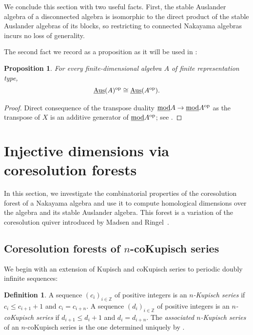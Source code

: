 \documentclass[a4paper]{amsart}
\newtheorem{proposition}[theorem]{Proposition}
\theoremstyle{definition}
\newtheorem{definition}[theorem]{Definition}
\theoremstyle{remark}
\numberwithin{equation}{theorem}
\newcommand{\Dfn}[1]{\emph{\color{blue}#1}} %
\renewcommand{\mod}{\operatorname{mod}}
\newcommand{\sAus}{\operatorname{\underline{Aus}}}
\newcommand{\Z}{\mathbb{Z}}
\newcommand{\op}{\textnormal{op}}
\begin{document}
We conclude this section with two useful facts.
First, the stable Auslander algebra of a disconnected algebra is isomorphic to the direct product of the stable Auslander algebras of its blocks, so restricting to connected Nakayama algebras incurs no loss of generality.

The second fact we record as a proposition as it will be used in :

\begin{proposition}\label{Aus.op}
    For every finite-dimensional algebra $ A $ of finite representation type,
        \[
            \sAus(A)^{\op} \cong \sAus(A^{\op}).
        \]
\end{proposition}

\begin{proof}
    Direct consequence of the transpose duality $ \underline{\mod} A \to \underline{ \mod } A^\op $ as the transpose of $ X $ is an additive generator of $ \underline{\mod} A^\op $; see \cite[Proposition IV.1.6.(b)]{ARS}.
\end{proof}

\section{Injective dimensions via coresolution forests}\label{sec:coresolution-forests}

In this section, we investigate the combinatorial properties of the coresolution forest of a Nakayama algebra and use it to compute homological dimensions over the algebra and its
stable Auslander algebra. This forest is a variation of the
coresolution quiver introduced by Madsen and Ringel~\cite{Ma,Ri1,Ri2}.


\subsection{Coresolution forests of \texorpdfstring{$n$}{n}-coKupisch series}\label{sec:functional-digraph}


We begin with an extension of Kupisch and coKupisch series to periodic doubly infinite sequences:

\begin{definition}
  A sequence $(c_i)_{i\in\Z}$ of positive integers is an
  \Dfn{$n$-Kupisch series} if $c_i\leq c_{i+1} + 1$ and
  $c_i = c_{i+n}$.  A sequence $(d_i)_{i\in\Z}$ of positive integers
  is an \Dfn{$n$-coKupisch series} if $d_{i+1}\leq d_i + 1$ and
  $d_i = d_{i+n}$. The \Dfn{associated $ n $-Kupisch series} of an $ n $-coKupisch series is the one determined uniquely by .
\end{definition}
\end{document}
